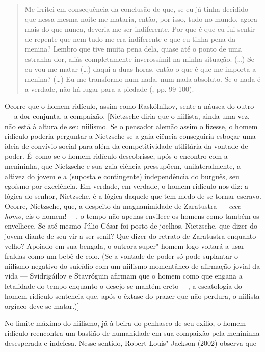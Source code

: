 \begin{quote}
Me irritei em consequência da conclusão de que, se eu já tinha decidido
que nessa mesma noite me mataria, então, por isso, tudo no mundo, agora
mais do que nunca, deveria me ser indiferente. Por que é que eu fui
sentir de repente que nem tudo me era indiferente e que eu tinha pena da
menina? Lembro que tive muita pena dela, quase até o ponto de uma
estranha dor, aliás completamente inverossímil na minha situação.
(\ldots{}) Se eu vou me matar (\ldots{}) daqui a duas horas, então o que
é que me importa a menina? (\ldots{}) Eu me transformo num nada, num
nada absoluto. Se o nada é a verdade, não há lugar para a piedade (,
pp. 99-100).
\end{quote}

Ocorre que o homem ridículo, assim como Raskólnikov, sente a náusea do
outro --- a dor conjunta, a compaixão. {[}Nietzsche diria que o niilista,
ainda uma vez, não está à altura de seu niilismo. Se o pensador alemão
assim o fizesse, o homem ridículo poderia perguntar a Nietzsche se a
gaia ciência conseguiria esboçar uma ideia de convívio social para além
da competitividade utilitária da vontade de poder. É~como se o homem
ridículo descobrisse, após o encontro com a menininha, que Nietzsche e
sua gaia ciência pressupõem, unilateralmente, a altivez do jovem e a
(suposta e contingente) independência do burguês, seu egoísmo por
excelência. Em verdade, em verdade, o homem ridículo nos diz: a lógica
do senhor, Nietzsche, é a lógica daquele que tem medo de se tornar
escravo. Ocorre, Nietzsche, que, a despeito da magnanimidade de
Zaratustra --- \emph{ecce homo}, eis o homem! ---, o tempo não apenas
envilece os homens como também os envelhece. Se até mesmo Júlio César
foi posto de joelhos, Nietzsche, que dizer do jovem diante de seu vir a
ser senil? Que dizer do retrato de Zaratustra enquanto velho? Apoiado em
sua bengala, o outrora super"-homem logo voltará a usar fraldas como um
bebê de colo. (Se a vontade de poder só pode suplantar o niilismo
negativo do suicídio com um niilismo momentâneo de afirmação jovial da
vida --- Svidrigáilov e Stavróguin afirmam que o homem como que engana a
letalidade do tempo enquanto o desejo se mantém ereto ---, a escatologia
do homem ridículo sentencia que, após o êxtase do prazer que não
perdura, o niilista orgíaco deve se matar.){]}

No limite máximo do niilismo, já à beira do penhasco de seu exílio, o
homem ridículo reencontra um bastião de humanidade em sua compaixão pela
menininha desesperada e indefesa. Nesse sentido, Robert Louis"-Jackson
(2002) observa que

